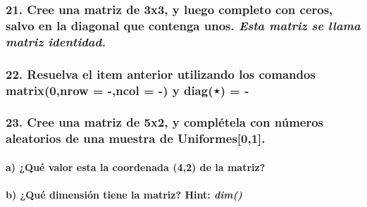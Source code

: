 \documentclass[
]{article}
\begin{document}
\hypertarget{cree-una-matriz-de-3x3-y-luego-completo-con-ceros-salvo-en-la-diagonal-que-contenga-unos.-esta-matriz-se-llama-matriz-identidad.}{%
\subsubsection{\texorpdfstring{21. Cree una matriz de 3x3, y luego
completo con ceros, salvo en la diagonal que contenga unos. \emph{Esta
matriz se llama matriz
identidad.}}{21. Cree una matriz de 3x3, y luego completo con ceros, salvo en la diagonal que contenga unos. Esta matriz se llama matriz identidad.}}\label{cree-una-matriz-de-3x3-y-luego-completo-con-ceros-salvo-en-la-diagonal-que-contenga-unos.-esta-matriz-se-llama-matriz-identidad.}}

\hypertarget{resuelva-el-item-anterior-utilizando-los-comandos-matrix0nrow--ncol---y-diag--}{%
\subsubsection{22. Resuelva el item anterior utilizando los comandos
matrix(0,nrow = -,ncol = -) y diag(⋆) =
-}\label{resuelva-el-item-anterior-utilizando-los-comandos-matrix0nrow--ncol---y-diag--}}

\hypertarget{cree-una-matriz-de-5x2-y-compluxe9tela-con-nuxfameros-aleatorios-de-una-muestra-de-uniformes01.}{%
\subsubsection{23. Cree una matriz de 5x2, y complétela con números
aleatorios de una muestra de
Uniformes{[}0,1{]}.}\label{cree-una-matriz-de-5x2-y-compluxe9tela-con-nuxfameros-aleatorios-de-una-muestra-de-uniformes01.}}

\hypertarget{a-quuxe9-valor-esta-la-coordenada-42-de-la-matriz}{%
\paragraph{a) ¿Qué valor esta la coordenada (4,2) de la
matriz?}\label{a-quuxe9-valor-esta-la-coordenada-42-de-la-matriz}}

\hypertarget{b-quuxe9-dimensiuxf3n-tiene-la-matriz-hint-dim}{%
\paragraph{\texorpdfstring{b) ¿Qué dimensión tiene la matriz? Hint:
\emph{dim()}}{b) ¿Qué dimensión tiene la matriz? Hint: dim()}}\label{b-quuxe9-dimensiuxf3n-tiene-la-matriz-hint-dim}}
\end{document}
